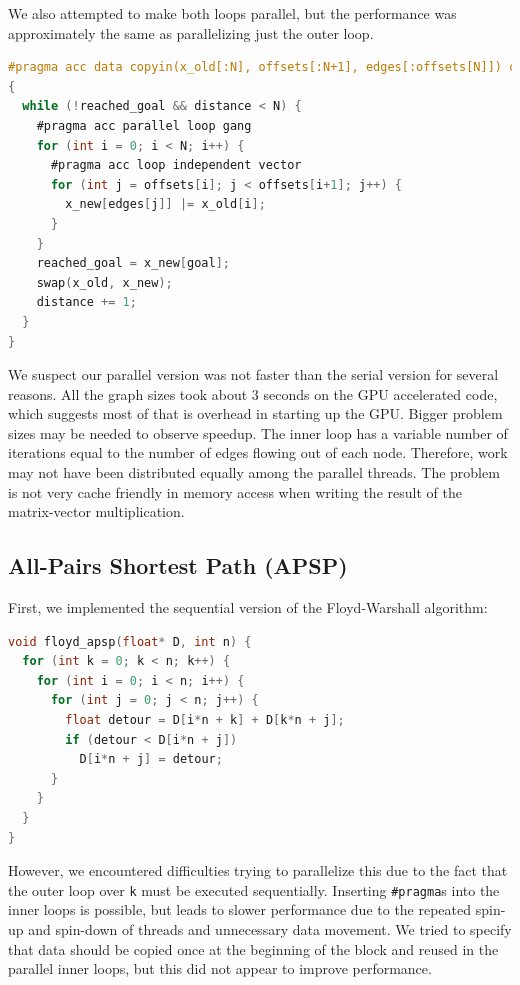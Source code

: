\documentclass[12pt]{article}
\newcommand*{\ttfamilywithbold}{\fontfamily{lmtt}\selectfont}
\begin{document}
We also attempted to make both loops parallel, but the performance was approximately the same as parallelizing just the outer loop.

\begin{lstlisting}[language=C,basicstyle=\ttfamilywithbold\footnotesize]
#pragma acc data copyin(x_old[:N], offsets[:N+1], edges[:offsets[N]]) copyout(x_new[:N])
{
  while (!reached_goal && distance < N) {
    #pragma acc parallel loop gang
    for (int i = 0; i < N; i++) {
      #pragma acc loop independent vector
      for (int j = offsets[i]; j < offsets[i+1]; j++) {
        x_new[edges[j]] |= x_old[i];
      }
    }
    reached_goal = x_new[goal];
    swap(x_old, x_new);
    distance += 1;
  }
}
\end{lstlisting}

We suspect our parallel version was not faster than the serial version for several reasons.
All the graph sizes took about 3 seconds on the GPU accelerated code, which suggests most of that is overhead in starting up the GPU.
Bigger problem sizes may be needed to observe speedup.
The inner loop has a variable number of iterations equal to the number of edges flowing out of each node.
Therefore, work may not have been distributed equally among the parallel threads.
The problem is not very cache friendly in memory access when writing the result of the matrix-vector multiplication.

\subsection*{All-Pairs Shortest Path (APSP)}

First, we implemented the sequential version of the Floyd-Warshall algorithm:

\begin{lstlisting}[language=C,basicstyle=\ttfamilywithbold\footnotesize]
void floyd_apsp(float* D, int n) {
  for (int k = 0; k < n; k++) {
    for (int i = 0; i < n; i++) {
      for (int j = 0; j < n; j++) {
        float detour = D[i*n + k] + D[k*n + j];
        if (detour < D[i*n + j])
          D[i*n + j] = detour;
      }
    }
  }
}
\end{lstlisting}

However, we encountered difficulties trying to parallelize this due to the fact that the outer loop over \texttt{k} must be executed sequentially. Inserting \texttt{\#pragma}s into the inner loops is possible, but leads to slower performance due to the repeated spin-up and spin-down of threads and unnecessary data movement. We tried to specify that data should be copied once at the beginning of the block and reused in the parallel inner loops, but this did not appear to improve performance.
\end{document}
